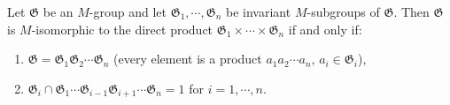 Let $\mathfrak{G}$ be an $M$-group and let $\mathfrak{G}_1, \cdots, \mathfrak{G}_n$ be invariant $M$-subgroups of $\mathfrak{G}$. Then $\mathfrak{G}$ is $M$-isomorphic to the direct product $\mathfrak{G}_1 \times \cdots \times \mathfrak{G}_n$ if and only if:
\begin{enumerate}
\item $\mathfrak{G} = \mathfrak{G}_1 \mathfrak{G}_2 \cdots \mathfrak{G}_n$ (every element is a product $a_1 a_2 \cdots a_n$, $a_i \in \mathfrak{G}_i$),
\item $\mathfrak{G}_i \cap \mathfrak{G}_1 \cdots \mathfrak{G}_{i-1} \mathfrak{G}_{i+1} \cdots \mathfrak{G}_n = 1$ for $i = 1, \cdots, n$.
\end{enumerate}
